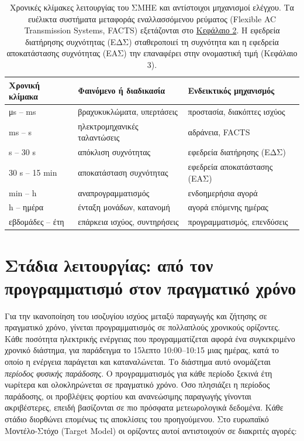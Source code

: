 \begin{table}[!htbp]
\centering
\begin{tabular}{lll}
\hline
Χρονική κλίμακα & Φαινόμενο ή διαδικασία & Ενδεικτικός μηχανισμός \\
\hline
μs -- ms   & βραχυκυκλώματα, υπερτάσεις   & προστασία, διακόπτες ισχύος \\
ms -- s    & ηλεκτρομηχανικές ταλαντώσεις & αδράνεια, FACTS \\
s -- 30 s  & απόκλιση συχνότητας          & εφεδρεία διατήρησης (ΕΔΣ) \\
30 s -- 15 min & αποκατάσταση συχνότητας  & εφεδρεία αποκατάστασης (ΕΑΣ) \\
min -- h   & αναπρογραμματισμός           & ενδοημερήσια αγορά \\
h -- ημέρα & ένταξη μονάδων, κατανομή     & αγορά επόμενης ημέρας \\
εβδομάδες -- έτη & επάρκεια ισχύος, συντηρήσεις & προγραμματισμός, επενδύσεις \\
\hline
\end{tabular}
\caption{Χρονικές κλίμακες λειτουργίας του ΣΜΗΕ και αντίστοιχοι μηχανισμοί ελέγχου. Τα ευέλικτα
συστήματα μεταφοράς εναλλασσόμενου ρεύματος (Flexible AC Transmission Systems, FACTS)
εξετάζονται στο \hyperref[kef-02-theoria]{Κεφάλαιο 2}. Η εφεδρεία
διατήρησης συχνότητας (ΕΔΣ) σταθεροποιεί τη συχνότητα και η εφεδρεία αποκατάστασης συχνότητας
(ΕΑΣ) την επαναφέρει στην ονομαστική τιμή (Κεφάλαιο 3).}
\label{tab:chronikes-klimakes}
\end{table}

\section{Στάδια λειτουργίας: από τον προγραμματισμό στον πραγματικό χρόνο}
\label{sec:stages}

Για την ικανοποίηση του ισοζυγίου ισχύος μεταξύ παραγωγής και ζήτησης σε πραγματικό χρόνο, γίνεται προγραμματισμός σε πολλαπλούς χρονικούς ορίζοντες. Κάθε ποσότητα ηλεκτρικής ενέργειας που προγραμματίζεται αφορά ένα συγκεκριμένο χρονικό
διάστημα, για παράδειγμα το 15λεπτο 10:00--10:15 μιας ημέρας, κατά το οποίο η ενέργεια παράγεται και καταναλώνεται. Το διάστημα αυτό ονομάζεται \emph{περίοδος φυσικής παράδοσης}. Ο προγραμματισμός για κάθε περίοδο ξεκινά έτη νωρίτερα και ολοκληρώνεται σε πραγματικό χρόνο. Όσο πλησιάζει η περίοδος παράδοσης, οι προβλέψεις φορτίου και ανανεώσιμης παραγωγής γίνονται ακριβέστερες, επειδή βασίζονται σε πιο πρόσφατα
μετεωρολογικά δεδομένα. Κάθε στάδιο διορθώνει επομένως τις αποκλίσεις του προηγούμενου. Στο ευρωπαϊκό
Μοντέλο-Στόχο (Target Model) οι ορίζοντες αυτοί αντιστοιχούν σε διακριτές αγορές:

